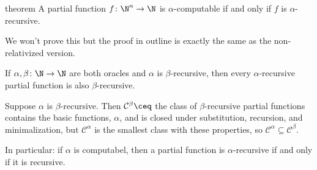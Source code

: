 \documentclass[class=article, crop=false]{standalone}
\begin{document}
\begin{result}{theorem}
  A partial function $f\colon \N^n \to \N$ is $\alpha$-computable if and only if $f$ is $\alpha$-recursive.
\end{result}
\begin{pf}
  We won't prove this but the proof in outline is exactly the same as the non-relativized version.
\end{pf}

\begin{ex}
  If $\alpha,\beta \colon \N \to \N$ are both oracles and $\alpha$ is $\beta$-recursive, then every $\alpha$-recursive partial function is also $\beta$-recursive.
    \begin{pf}
      Suppose $\alpha$ is $\beta$-recursive. Then $\mathcal C^\beta \ceq $ the class of $\beta$-recursive partial functions contains the basic functions, $\alpha$, and is closed under substitution, recursion, and minimalization, but $\mathcal C^\alpha$ is the smallest class with these properties, so $\mathcal C^\alpha \subseteq \mathcal C^\beta$.
    \end{pf}

  In particular: if $\alpha$ is computabel, then a partial function is $\alpha$-recursive if and only if it is recursive.


\end{ex}
\end{document}
